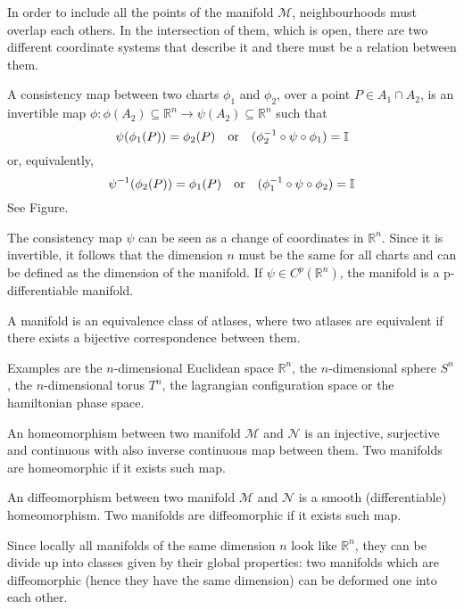     In order to include all the points of the manifold $\mathcal M$, neighbourhoods must overlap each others. In the intersection of them, which is open, there are two different coordinate systems that describe it and there must be a relation between them.
    \begin{definition}
        A consistency map between two charts $\phi_1$ and $\phi_2$, over a point $P \in A_1 \cap A_2$, is an invertible map $\phi \colon \phi(A_2) \subseteq \mathbb R^n \rightarrow \psi(A_2) \subseteq \mathbb R^n $ such that 
        \begin{equation*}
            \psi(\phi_1(P)) = \phi_2(P) \quad \textnormal{or} \quad (\phi_2^{-1} \circ \psi \circ \phi_1) = \mathbb I
        \end{equation*}
        or, equivalently, 
        \begin{equation*}
            \psi^{-1} (\phi_2(P)) = \phi_1(P) \quad \textnormal{or} \quad (\phi_1^{-1} \circ \psi \circ \phi_2) = \mathbb I
        \end{equation*}
        See Figure.
    \end{definition}
    \noindent The consistency map $\psi$ can be seen as a change of coordinates in $\mathbb R^n$. Since it is invertible, it follows that the dimension $n$ must be the same for all charts and can be defined as the dimension of the manifold. If $\psi \in C^p(\mathbb R^n)$, the manifold is a p-differentiable manifold. 

    \begin{definition}[Manifold]
        A manifold is an equivalence class of atlases, where two atlases are equivalent if there exists a bijective correspondence between them.
    \end{definition}
    \noindent Examples are the $n$-dimensional Euclidean space $\mathbb R^n$, the $n$-dimensional sphere $S^n$, the $n$-dimensional torus $T^n$, the lagrangian configuration space or the hamiltonian phase space.

    \begin{definition}[Homeomorphism]
        An homeomorphism between two manifold $\mathcal M$ and $\mathcal N$ is an injective, surjective and continuous with also inverse continuous map between them. Two manifolds are homeomorphic if it exists such map.
    \end{definition}
    \begin{definition}[Diffeomorphism]
        An diffeomorphism between two manifold $\mathcal M$ and $\mathcal N$ is a smooth (differentiable) homeomorphism. Two manifolds are diffeomorphic if it exists such map.
    \end{definition}
    \noindent Since locally all manifolds of the same dimension $n$ look like $\mathbb R^n$, they can be divide up into classes given by their global properties: two manifolds which are diffeomorphic (hence they have the same dimension) can be deformed one into each other. 
 
